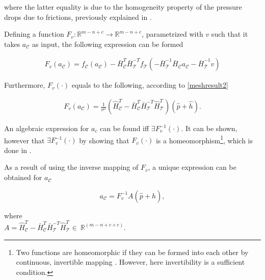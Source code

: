 where the latter equality is due to the homogeneity property of the pressure drops due to frictions, previously explained in .

Defining a function $F_v : \mathbb{R}^{m-n+c} \rightarrow \mathbb{R}^{m-n+c}$, parametrized with $v$ such that it takes $a_{\mathcal{C}}$ as input, the following expression can be formed

\begin{equation}
\begin{split}
\label{Fv}
F_v(a_{\mathcal{C}}) = f_{\mathcal{C}}(a_{\mathcal{C}}) -\bar{H}^T_{\mathcal{C}}\bar{H}^{-T}_{\mathcal{T}} f_{\mathcal{T}}(-\bar{H}^{-1}_{\mathcal{T}} \bar{H}_{\mathcal{C}} a_{\mathcal{C}} - \bar{H}^{-1}_{\mathcal{T}} v) 
\end{split}
\end{equation}

Furthermore, $F_v(\cdot)$ equals to the following, according to \eqref{meshresult2}

\begin{equation}
\begin{split}
\label{Fv1}
F_v(a_{\mathcal{C}}) = \frac{1}{\sigma^2} (\hat{H}^T_{\mathcal{C}} -\bar{H}^T_{\mathcal{C}}\bar{H}^{-T}_{\mathcal{T}}\hat{H}^T_{\mathcal{T}})(\hat{p} + \hat{h}).
\end{split}
\end{equation}

An algebraic expression for $a_c$ can be found iff $\exists F_v^{-1}(\cdot)$. It can be shown, however that $\exists F_v^{-1}(\cdot)$ by showing that $F_v(\cdot)$ is a homeomorphism\footnote{Two functions are homeomorphic if they can be formed into each other by continuous, invertible mapping \cite{krantz2012handbook}. However, here invertibility is a sufficient condition.}, which is done in \cite{oneinput_paper}.  

As a result of using the inverse mapping of $F_v$, a unique expression can be obtained for $a_{\mathcal{C}}$

\begin{equation}
\label{Fv2}
a_{\mathcal{C}} = F_v^{-1} A(\hat{p} + \hat{h}),
\end{equation}

  \begin{minipage}[t]{0.60\textwidth}
where\\
\hspace*{8mm} $A = \hat{H}^T_{\mathcal{C}} -\bar{H}^T_{\mathcal{C}}\bar{H}^{-T}_{\mathcal{T}}\hat{H}^T_{\mathcal{T}}\in \: \mathbb{R}^{(m-n+c \times c)}$. 
\end{minipage}

